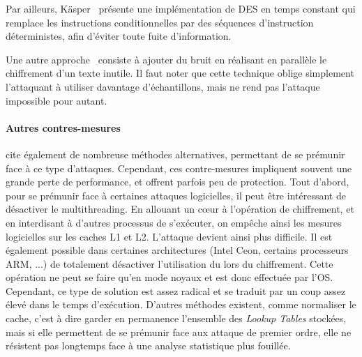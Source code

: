 \documentclass[a4paper,11pt]{article}
\begin{document}
Par ailleurs, Käsper~\cite{kasper2009faster} présente une implémentation de DES en temps constant qui remplace les instructions conditionnelles par des séquences d'instruction déterministes, afin d'éviter toute fuite d'information.

Une autre approche~\cite{osvik2006cache} consiste à ajouter du bruit en réalisant en parallèle le chiffrement d'un texte inutile. Il faut noter que cette technique oblige simplement l'attaquant à utiliser davantage d'échantillons, mais ne rend pas l'attaque impossible pour autant.


\paragraph{Autres contres-mesures}
\cite{kasper2009faster} cite également de nombreuse méthodes alternatives, permettant de se prémunir face à ce type d'attaques. Cependant, ces contre-mesures impliquent souvent une grande perte de performance, et offrent parfois peu de protection.
Tout d'abord, pour se prémunir face à certaines attaques logicielles, il peut être intéressant de désactiver le multithreading. En allouant un cœur à l'opération de chiffrement, et en interdisant à d'autres processus de s'exécuter, on empêche ainsi les mesures logicielles sur les caches L1 et L2. L'attaque devient ainsi plus difficile.
Il est également possible dans certaines architectures (Intel Ceon, certains processeurs ARM, ...) de totalement désactiver l'utilisation du lors du chiffrement. Cette opération ne peut se faire qu'en mode noyaux et est donc effectuée par l'OS. Cependant, ce type de solution est assez radical et se traduit par un coup assez élevé dans le temps d'exécution.
D'autres méthodes existent, comme normaliser le cache, c'est à dire garder en permanence l'ensemble des \emph{Lookup Tables} stockées, mais si elle permettent de se prémunir face aux attaque de premier ordre, elle ne résistent pas longtemps face à une analyse statistique plus fouillée.
\end{document}
